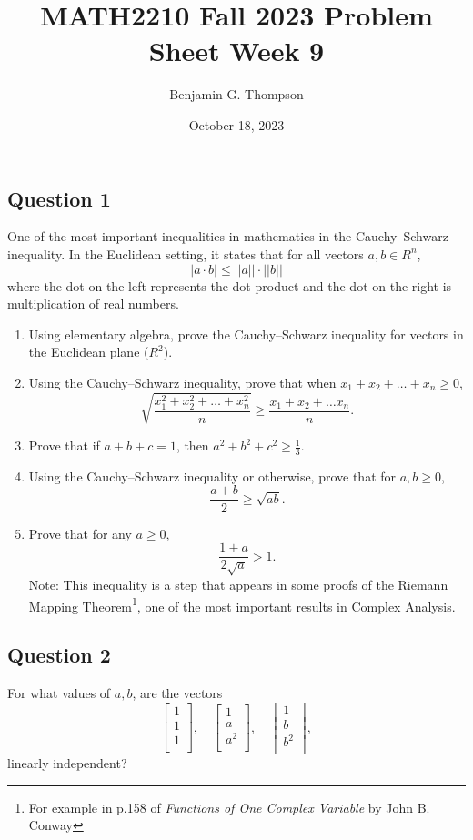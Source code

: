 \documentclass[12pt, a4paper]{article}
\title{MATH2210 Fall 2023 Problem Sheet Week 9}
\author{Benjamin G. Thompson}
\date{October 18, 2023}
\begin{document}
\subsection*{Question 1}
One of the most important inequalities in mathematics in the Cauchy–Schwarz inequality. In the Euclidean setting, it states that for all vectors $a, b \in R^n$,
\[
| a \cdot b | \leq ||a || \cdot ||b ||
\]
where the dot on the left represents the dot product and the dot on the right is multiplication of real numbers.

\begin{enumerate}
	\item Using elementary algebra, prove the Cauchy–Schwarz inequality for vectors in the Euclidean plane ($R^2$).
	\item Using the Cauchy–Schwarz inequality, prove that when $x_1 + x_2 + \ldots + x_n \geq 0$, 
	\[
	\sqrt{\frac{x_1^2 + x_2^2 + \ldots + x_n^2}{n}} \geq \frac{x_1 + x_2 + \ldots x_n}{n}.
	\]
	\item Prove that if $a + b + c =1$, then $a^2 + b^2 + c^2 \geq \frac{1}{3}$.
	\item Using the Cauchy–Schwarz inequality or otherwise, prove that for $a,b \geq 0$,
	\[
	\frac{a + b}{2} \geq \sqrt{ab}.
	\] 
	\item Prove that for any $a \geq 0$,
	\[
	\frac{1 + a}{2\sqrt{a}} > 1.
	\]
        Note: This inequality is a step that appears in some proofs of the Riemann Mapping Theorem\footnote{For example in p.158 of \emph{Functions of One Complex Variable} by John B. Conway}, one of the most important results in Complex Analysis.
\end{enumerate}

\subsection*{Question 2}
For what values of $a,b$, are the vectors
\[
\begin{bmatrix}
1 \\
1 \\
1 \\
\end{bmatrix}, \quad
\begin{bmatrix}
1 \\
a \\
a^2 \\
\end{bmatrix}, \quad
\begin{bmatrix}
1 \\
b \\
b^2 \\
\end{bmatrix},
\]
linearly independent?
\end{document}
